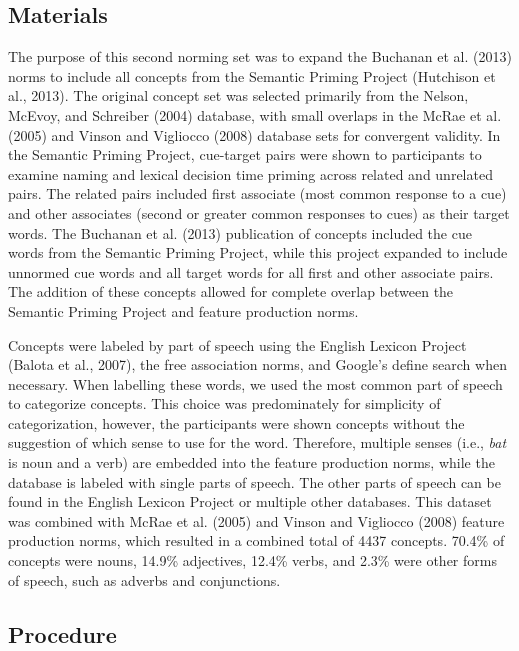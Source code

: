 \documentclass[english,man]{apa6}
\theoremstyle{definition}
\theoremstyle{definition}
\theoremstyle{definition}
\theoremstyle{remark}
\begin{document}
\subsection{Materials}\label{materials}

The purpose of this second norming set was to expand the Buchanan et al.
(2013) norms to include all concepts from the Semantic Priming Project
(Hutchison et al., 2013). The original concept set was selected
primarily from the Nelson, McEvoy, and Schreiber (2004) database, with
small overlaps in the McRae et al. (2005) and Vinson and Vigliocco
(2008) database sets for convergent validity. In the Semantic Priming
Project, cue-target pairs were shown to participants to examine naming
and lexical decision time priming across related and unrelated pairs.
The related pairs included first associate (most common response to a
cue) and other associates (second or greater common responses to cues)
as their target words. The Buchanan et al. (2013) publication of
concepts included the cue words from the Semantic Priming Project, while
this project expanded to include unnormed cue words and all target words
for all first and other associate pairs. The addition of these concepts
allowed for complete overlap between the Semantic Priming Project and
feature production norms.

Concepts were labeled by part of speech using the English Lexicon
Project (Balota et al., 2007), the free association norms, and Google's
define search when necessary. When labelling these words, we used the
most common part of speech to categorize concepts. This choice was
predominately for simplicity of categorization, however, the
participants were shown concepts without the suggestion of which sense
to use for the word. Therefore, multiple senses (i.e., \emph{bat} is
noun and a verb) are embedded into the feature production norms, while
the database is labeled with single parts of speech. The other parts of
speech can be found in the English Lexicon Project or multiple other
databases. This dataset was combined with McRae et al. (2005) and Vinson
and Vigliocco (2008) feature production norms, which resulted in a
combined total of 4437 concepts. 70.4\% of concepts were nouns, 14.9\%
adjectives, 12.4\% verbs, and 2.3\% were other forms of speech, such as
adverbs and conjunctions.

\subsection{Procedure}\label{procedure}
\end{document}

